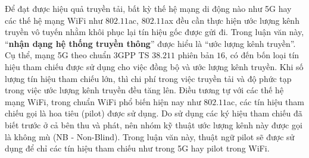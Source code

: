 Để đạt được hiệu quả truyền tải, bất kỳ thế hệ mạng di động nào như 5G hay các thế hệ mạng WiFi như $802.11$ac, $802.11$ax đều cần thực hiện ước lượng kênh truyền vô tuyến nhằm khôi phục lại tín hiệu gốc được gửi đi. Trong luận văn này, ``\textbf{nhận dạng hệ thống truyền thông}'' được hiểu là ``ước lượng kênh truyền''. Cụ thể, mạng 5G theo chuẩn 3GPP TS $38.211$ phiên bản $16$, có đến bốn loại tín hiệu tham chiếu được sử dụng cho việc đồng bộ và ước lượng kênh truyền. 
Khi số lượng tín hiệu tham chiếu lớn, thì chi phí trong việc truyền tải và độ phức tạp trong việc ước lượng kênh truyền đều tăng lên. Điều tương tự với các thế hệ mạng WiFi, trong chuẩn WiFi phổ biến hiện nay như $802.11$ac, các tín hiệu tham chiếu gọi là hoa tiêu (pilot) được sử dụng. 
Do sử dụng các ký hiệu tham chiếu đã biết trước ở cả bên thu và phát, nên nhóm kỹ thuật ước lượng kênh này được gọi là không mù (NB - Non-Blind). 
Trong luận văn này, thuật ngữ pilot sẽ được sử dụng để chỉ các tín hiệu tham chiếu như trong 5G hay pilot trong WiFi.



